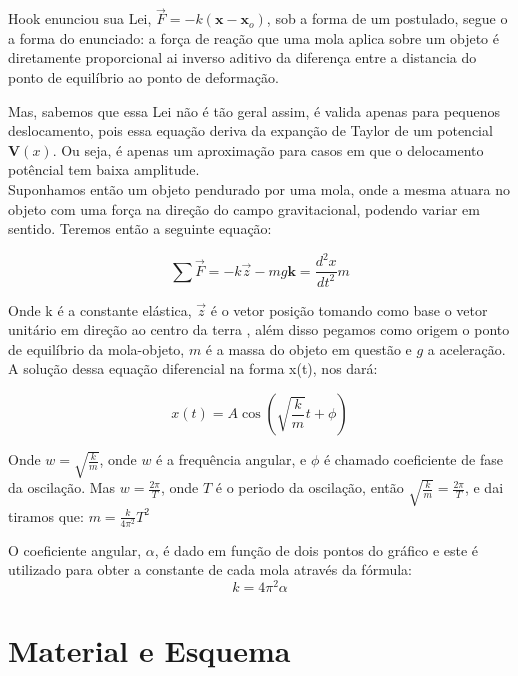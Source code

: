 \documentclass{article}
\begin{document}
  Hook enunciou sua Lei, $ \vec{F}=-k(\textbf{x}-\textbf{x}_o)$, sob a forma de um postulado, segue o a forma do enunciado: a força de reação que uma mola aplica sobre um objeto é diretamente proporcional ai inverso aditivo da diferença entre a distancia do ponto de equilíbrio ao ponto de deformação.


  Mas, sabemos que essa Lei não é tão geral assim, é valida apenas para pequenos deslocamento, pois essa equação deriva da expanção de Taylor de um potencial $\textbf{V}(x)$. Ou seja, é apenas um aproximação para casos em que o delocamento potêncial tem baixa amplitude.
\\

  Suponhamos então um objeto pendurado por uma mola, onde a mesma atuara no objeto com uma força na direção do campo gravitacional, podendo variar em sentido. Teremos então a seguinte equação:

$$\sum \vec{F}=-k\vec{z}-mg\textbf{k}=\frac{d^2x}{dt^2}m$$

Onde k é a constante elástica, $\vec{z}$ é o vetor posição tomando como base o vetor unitário em direção ao centro da terra , além disso pegamos como origem o ponto de equilíbrio da mola-objeto, $m$ é a massa do objeto em questão e $g$ a aceleração.
A solução dessa equação diferencial na forma x(t), nos dará:

$$x(t)=A\cos(\sqrt{\frac{k}{m}}t+\phi)$$

Onde $w=\sqrt{\frac{k}{m}}$, onde $w$ é a frequência angular, e $\phi$ é chamado coeficiente de fase da oscilação. Mas $w=\frac{2\pi}{T}$, onde $T$ é o periodo da oscilação, então $\sqrt{\frac{k}{m}}=\frac{2\pi}{T}$, e dai tiramos que: $ m=\frac{k}{4\pi^2}T^2$

O coeficiente angular, $\alpha$, é dado em função de dois pontos do gráfico e este é utilizado para obter a constante de cada mola através da fórmula:
\begin{equation}
k=4\pi^2\alpha
\end{equation}

\section{Material e Esquema}
\end{document}
